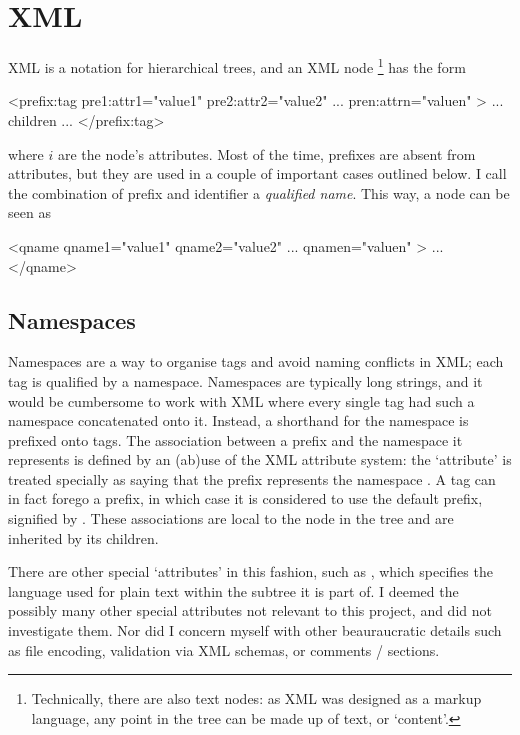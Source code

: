 \section{XML}
XML is a notation for hierarchical trees, and an XML node \footnote{Technically, there are also text nodes: as XML was designed as a markup language, any point in the tree can be made up of text, or `content'.} has the form
\begin{xml}
<prefix:tag pre1:attr1="value1" pre2:attr2="value2"
            ...
            pren:attrn="valuen" >
   ... children ...
</prefix:tag>
\end{xml}
where \(i\) are the node's attributes. Most of the time, prefixes are absent from attributes, but they are used in a couple of important cases outlined below. I call the combination of prefix and identifier a \emph{qualified name}. This way, a node can be seen as
\begin{xml}
<qname qname1="value1" qname2="value2" ... qnamen="valuen" >
  ...
</qname>
\end{xml}

\subsection{Namespaces}\label{sec:namespaces}
Namespaces are a way to organise tags and avoid naming conflicts in XML; each tag is qualified by a namespace. Namespaces are typically long strings, and it would be cumbersome to work with XML where every single tag had such a namespace concatenated onto it. Instead, a shorthand for the namespace is prefixed onto tags. The association between a prefix and the namespace it represents is defined by an (ab)use of the XML attribute system: the `attribute'  is treated specially as saying that the prefix  represents the namespace . A tag can in fact forego a prefix, in which case it is considered to use the default prefix, signified by . These associations are local to the node in the tree and are inherited by its children.

There are other special `attributes' in this fashion, such as , which specifies the language used for plain text within the subtree it is part of. I deemed the possibly many other special attributes not relevant to this project, and did not investigate them. Nor did I concern myself with other beauraucratic details such as file encoding, validation via XML schemas, or comments /  sections.

